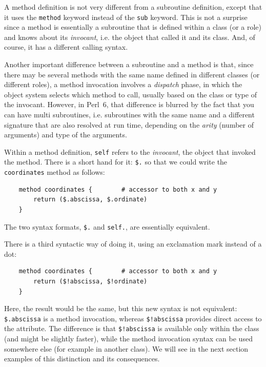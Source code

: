 A method definition is not very different from a subroutine 
definition, except that it uses the {\tt method} keyword 
instead of the {\tt sub} keyword. This is not a surprise 
since a method is essentially a subroutine that is defined 
within a class (or a role) and knows about its 
\emph{invocant}, i.e. the object that called it and its class. 
And, of course, it has a different calling syntax.

Another important difference between a subroutine and a method 
is that, since there may be several methods with the same name 
defined in different classes (or different roles), a method 
invocation involves a \emph{dispatch} phase, in 
which the object system selects which method to call, usually 
based on the class or type of the invocant. However, in 
Perl~6, that difference is blurred by the fact that you can 
have multi subroutines, i.e. subroutines with the same name 
and a different signature that are also resolved at run time, 
depending on the \emph{arity} (number of arguments) and type of 
the arguments. 

Within a method definition, {\tt self} refers to the 
\emph{invocant}, the object that invoked the method. 
There is a short hand for it: \verb'$.' so that we could 
write the {\tt coordinates} method as follows:

\begin{verbatim}
    method coordinates {        # accessor to both x and y
        return ($.abscissa, $.ordinate)
    }
\end{verbatim}

The two syntax formats, \verb'$.' and {\tt self.}, are 
essentially equivalent.

There is a third syntactic way of doing it, using an 
exclamation mark instead of a dot:

\begin{verbatim}
    method coordinates {        # accessor to both x and y
        return ($!abscissa, $!ordinate)
    }
\end{verbatim}

Here, the result would be the same, but this new syntax is 
not equivalent: \verb'$.abscissa' is a method invocation, 
whereas \verb'$!abscissa' provides direct access to the attribute.
The difference is that \verb'$!abscissa' is available only 
within the class (and might be slightly faster), while 
the method invocation syntax can be used somewhere else 
(for example in another class). We will see in the next section 
examples of this distinction and its consequences.

